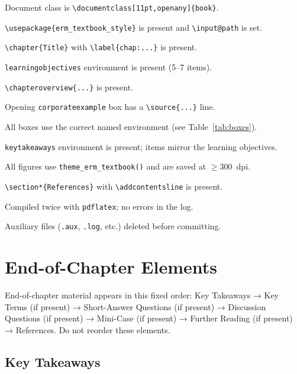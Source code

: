 \documentclass[11pt,openany]{book}
\newcommand{\code}[1]{\texttt{\small #1}}
\begin{document}
\begin{checklist}
  \item Document class is \code{\textbackslash documentclass[11pt,openany]\{book\}}.
  \item \code{\textbackslash usepackage\{erm\_textbook\_style\}} is present and \code{\textbackslash input@path} is set.
  \item \code{\textbackslash chapter\{Title\}} with \code{\textbackslash label\{chap:...\}} is present.
  \item \code{learningobjectives} environment is present (5--7 items).
  \item \code{\textbackslash chapteroverview\{...\}} is present.
  \item Opening \code{corporateexample} box has a \code{\textbackslash source\{...\}} line.
  \item All boxes use the correct named environment (see Table~\ref{tab:boxes}).
  \item \code{keytakeaways} environment is present; items mirror the learning objectives.
  \item All figures use \code{theme\_erm\_textbook()} and are saved at $\geq$300~dpi.
  \item \code{\textbackslash section*\{References\}} with \code{\textbackslash addcontentsline} is present.
  \item Compiled twice with \code{pdflatex}; no errors in the log.
  \item Auxiliary files (\code{.aux}, \code{.log}, etc.) deleted before committing.
\end{checklist}


\section{End-of-Chapter Elements}
\label{sec:endmatter}

End-of-chapter material appears in this fixed order: Key Takeaways → Key Terms (if present) → Short-Answer Questions (if present) → Discussion Questions (if present) → Mini-Case (if present) → Further Reading (if present) → References. Do not reorder these elements.

\subsection{Key Takeaways}
\end{document}
